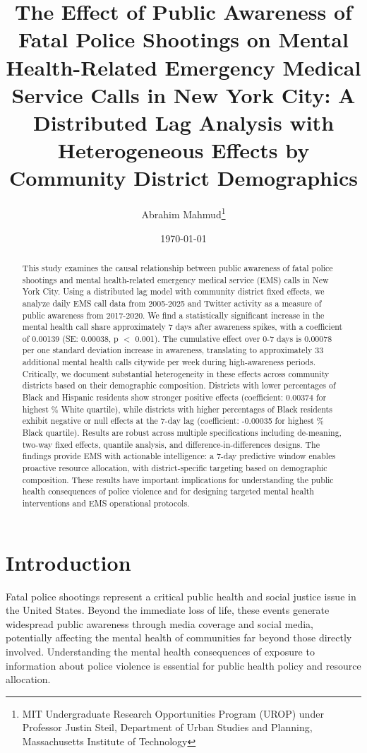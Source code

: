 \documentclass[11pt,a4paper]{article}
\title{The Effect of Public Awareness of Fatal Police Shootings on Mental Health-Related Emergency Medical Service Calls in New York City: A Distributed Lag Analysis with Heterogeneous Effects by Community District Demographics}
\author{Abrahim Mahmud\thanks{MIT Undergraduate Research Opportunities Program (UROP) under Professor Justin Steil, Department of Urban Studies and Planning, Massachusetts Institute of Technology}}
\date{\today}
\begin{document}
\maketitle

\begin{abstract}
This study examines the causal relationship between public awareness of fatal police shootings and mental health-related emergency medical service (EMS) calls in New York City. Using a distributed lag model with community district fixed effects, we analyze daily EMS call data from 2005-2025 and Twitter activity as a measure of public awareness from 2017-2020. We find a statistically significant increase in the mental health call share approximately 7 days after awareness spikes, with a coefficient of 0.00139 (SE: 0.00038, p $<$ 0.001). The cumulative effect over 0-7 days is 0.00078 per one standard deviation increase in awareness, translating to approximately 33 additional mental health calls citywide per week during high-awareness periods. Critically, we document substantial heterogeneity in these effects across community districts based on their demographic composition. Districts with lower percentages of Black and Hispanic residents show stronger positive effects (coefficient: 0.00374 for highest \% White quartile), while districts with higher percentages of Black residents exhibit negative or null effects at the 7-day lag (coefficient: -0.00035 for highest \% Black quartile). Results are robust across multiple specifications including de-meaning, two-way fixed effects, quantile analysis, and difference-in-differences designs. The findings provide EMS with actionable intelligence: a 7-day predictive window enables proactive resource allocation, with district-specific targeting based on demographic composition. These results have important implications for understanding the public health consequences of police violence and for designing targeted mental health interventions and EMS operational protocols.
\end{abstract}

\section{Introduction}

Fatal police shootings represent a critical public health and social justice issue in the United States. Beyond the immediate loss of life, these events generate widespread public awareness through media coverage and social media, potentially affecting the mental health of communities far beyond those directly involved. Understanding the mental health consequences of exposure to information about police violence is essential for public health policy and resource allocation.
\end{document}
